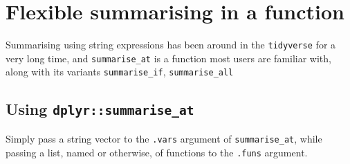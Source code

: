 \documentclass[]{book}
\newenvironment{Shaded}{}{}
\newcommand{\CommentTok}[1]{\textcolor[rgb]{0.38,0.63,0.69}{\textit{#1}}}
\newcommand{\ControlFlowTok}[1]{\textcolor[rgb]{0.00,0.44,0.13}{\textbf{#1}}}
\newcommand{\DataTypeTok}[1]{\textcolor[rgb]{0.56,0.13,0.00}{#1}}
\newcommand{\KeywordTok}[1]{\textcolor[rgb]{0.00,0.44,0.13}{\textbf{#1}}}
\newcommand{\NormalTok}[1]{#1}
\newcommand{\OperatorTok}[1]{\textcolor[rgb]{0.40,0.40,0.40}{#1}}
\newcommand{\StringTok}[1]{\textcolor[rgb]{0.25,0.44,0.63}{#1}}
\begin{document}
\hypertarget{flexible-summarising-in-a-function}{%
\section{Flexible summarising in a function}\label{flexible-summarising-in-a-function}}

Summarising using string expressions has been around in the \texttt{tidyverse} for a very long time, and \texttt{summarise\_at} is a function most users are familiar with, along with its variants \texttt{summarise\_if}, \texttt{summarise\_all}

\hypertarget{using-dplyrsummarise_at}{%
\subsection{\texorpdfstring{Using \texttt{dplyr::summarise\_at}}{Using dplyr::summarise\_at}}\label{using-dplyrsummarise_at}}

Simply pass a string vector to the \texttt{.vars} argument of \texttt{summarise\_at}, while passing a list, named or otherwise, of functions to the \texttt{.funs} argument.

\begin{Shaded}
\end{Shaded}
\end{document}
